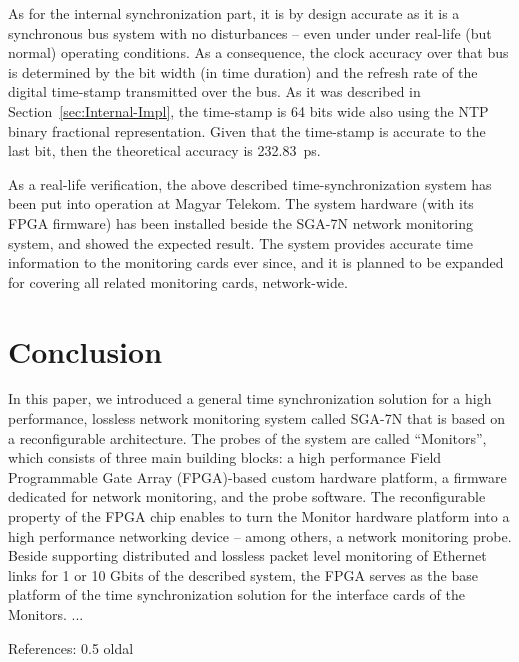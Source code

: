 \documentclass[journal]{IEEEtran}
\begin{document}
As for the internal synchronization part, it is by design accurate as it is a synchronous bus system with no
disturbances -- even under under real-life (but normal) operating conditions. As a
consequence, the clock accuracy over that bus is determined by the bit width (in time duration) and the refresh rate of the digital
time-stamp transmitted over the bus. As it was described in Section~\ref{sec:Internal-Impl}, the
time-stamp is 64 bits wide also using the NTP binary fractional representation. Given that the time-stamp is accurate
to the last bit, then the theoretical accuracy is \SI{232.83}{\pico\second}.


As a real-life verification, the above described time-synchronization system has been put into operation at Magyar Telekom. The system hardware (with its FPGA firmware) has been installed beside the SGA-7N network monitoring system, and showed the expected result. The system provides accurate time information to the monitoring cards ever since, and it is planned to be expanded for covering all related monitoring cards, network-wide.

\section{Conclusion}

In this paper, we introduced a general time synchronization solution for a high performance, lossless network monitoring system called SGA-7N that is based on a reconfigurable architecture. The probes of the system are called ``Monitors'', which consists of three main building blocks: a high performance Field Programmable Gate Array (FPGA)-based custom hardware platform, a firmware dedicated for network monitoring, and the probe software. The reconfigurable property of the FPGA chip enables to turn the Monitor hardware platform into a high performance networking device -- among others, a network monitoring probe. Beside supporting distributed and lossless packet level monitoring of Ethernet links for 1 or 10 Gbit\/s of the described system, the FPGA serves as the base platform of the time synchronization solution for the interface cards of the Monitors.
...

References: 0.5 oldal
\end{document}
